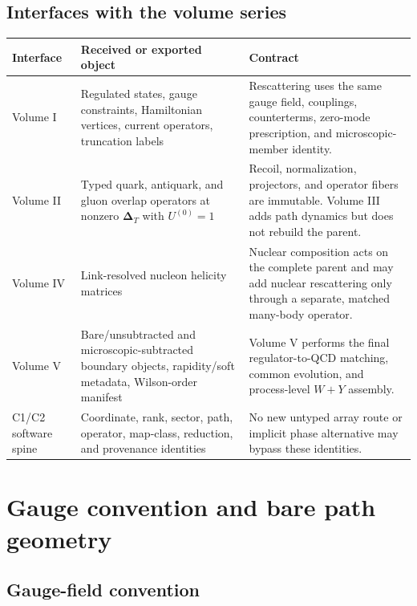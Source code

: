 \documentclass[11pt]{article}
\newcommand{\DT}{\bm{\Delta}_{T}}
\begin{document}
\subsection{Interfaces with the volume series}

\begin{longtable}{L{0.17\textwidth}L{0.31\textwidth}L{0.43\textwidth}}
\toprule
Interface & Received or exported object & Contract\\
\midrule
\endhead
Volume I & Regulated states, gauge constraints, Hamiltonian vertices,
current operators, truncation labels & Rescattering uses the same gauge field,
couplings, counterterms, zero-mode prescription, and microscopic-member
identity.\\
Volume II & Typed quark, antiquark, and gluon overlap operators at nonzero
\(\DT\) with \(U^{(0)}=1\) & Recoil, normalization, projectors, and
operator fibers are immutable.  Volume III adds path dynamics but does not
rebuild the parent.\\
Volume IV & Link-resolved nucleon helicity matrices & Nuclear composition
acts on the complete parent and may add nuclear rescattering only through a
separate, matched many-body operator.\\
Volume V & Bare/unsubtracted and microscopic-subtracted boundary objects,
rapidity/soft metadata, Wilson-order manifest & Volume V performs the final
regulator-to-QCD matching, common evolution, and process-level \(W+Y\)
assembly.\\
C1/C2 software spine & Coordinate, rank, sector, path, operator, map-class,
reduction, and provenance identities & No new untyped array route or implicit
phase alternative may bypass these identities.\\
\bottomrule
\end{longtable}

\section{Gauge convention and bare path geometry}
\label{sec:gauge-path}

\subsection{Gauge-field convention}
\end{document}
